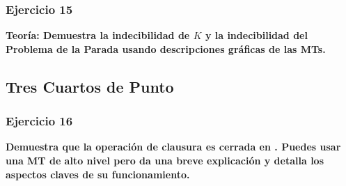 \documentclass{article}
\begin{document}
% 
% 
 
 
 \subsubsection*{Ejercicio 15} 
 \textbf{Teoría: Demuestra la indecibilidad de $K$ y la indecibilidad del Problema de la Parada usando descripciones gráficas de las MTs.}
 
\subsection{Tres Cuartos de Punto}
\label{sec:trescuartospunto}
\subsubsection*{Ejercicio 16} \textbf{Demuestra que la operación de clausura es cerrada en \lr.  Puedes usar una MT de alto nivel pero da una breve explicación y detalla los aspectos claves de su funcionamiento.}
\end{document}

